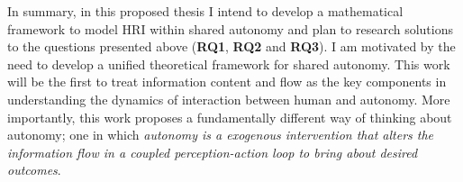 \documentclass[12pt]{article}
\newcommand{\POINTS}[1]{{\textbf{\color{red}{#1}}}}
\begin{document}


In summary, in this proposed thesis I intend to develop a mathematical framework to model HRI within shared autonomy and plan to research solutions to the questions presented above (\textbf{RQ1}, \textbf{RQ2} and \textbf{RQ3}). I am motivated by the need to develop a unified theoretical framework for shared autonomy. This work will be the first to treat information content and flow as the key components in understanding the dynamics of interaction between human and autonomy. More importantly, this work proposes a fundamentally different way of thinking about autonomy; one in which \textit{autonomy is a exogenous intervention that alters the information flow in a coupled perception-action loop to bring about desired outcomes}.
\end{document}
